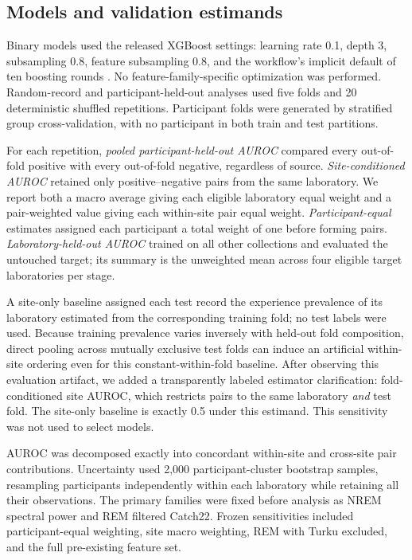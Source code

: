\documentclass[10pt,twocolumn]{article}
\begin{document}
\subsection{Models and validation estimands}

Binary models used the released XGBoost settings: learning rate 0.1, depth 3,
subsampling 0.8, feature subsampling 0.8, and the workflow's implicit default
of ten boosting rounds \citep{chen2016xgboost}. No feature-family-specific
optimization was performed. Random-record and participant-held-out analyses
used five folds and 20 deterministic shuffled repetitions. Participant folds
were generated by stratified group cross-validation, with no participant in
both train and test partitions.

For each repetition, \emph{pooled participant-held-out AUROC} compared every
out-of-fold positive with every out-of-fold negative, regardless of source.
\emph{Site-conditioned AUROC} retained only positive--negative pairs from the
same laboratory. We report both a macro average giving each eligible
laboratory equal weight and a pair-weighted value giving each within-site pair
equal weight. \emph{Participant-equal} estimates assigned each participant a
total weight of one before forming pairs. \emph{Laboratory-held-out AUROC}
trained on all other collections and evaluated the untouched target; its
summary is the unweighted mean across four eligible target laboratories per
stage.

A site-only baseline assigned each test record the experience prevalence of
its laboratory estimated from the corresponding training fold; no test labels
were used. Because training prevalence varies inversely with held-out fold
composition, direct pooling across mutually exclusive test folds can induce an
artificial within-site ordering even for this constant-within-fold baseline.
After observing this evaluation artifact, we added a transparently labeled
estimator clarification: fold-conditioned site AUROC, which restricts pairs to
the same laboratory \emph{and} test fold. The site-only baseline is exactly
0.5 under this estimand. This sensitivity was not used to select models.

AUROC was decomposed exactly into concordant within-site and cross-site pair
contributions. Uncertainty used 2,000 participant-cluster bootstrap samples,
resampling participants independently within each laboratory while retaining
all their observations. The primary families were fixed before analysis as
NREM spectral power and REM filtered Catch22. Frozen sensitivities included
participant-equal weighting, site macro weighting, REM with Turku excluded,
and the full pre-existing feature set.
\end{document}
